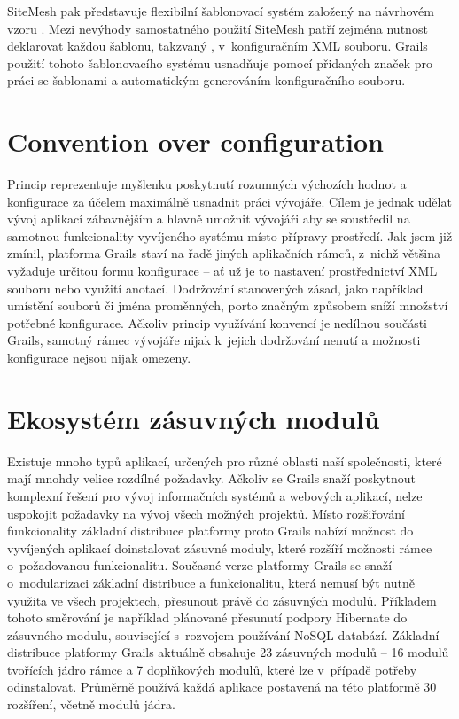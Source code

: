 \indent
SiteMesh pak představuje flexibilní šablonovací systém založený na návrhovém vzoru . Mezi nevýhody samostatného použití SiteMesh patří zejména nutnost deklarovat každou šablonu, takzvaný , v~konfiguračním XML souboru. Grails použití tohoto šablonovacího systému usnadňuje pomocí přidaných značek pro práci se šablonami a automatickým generováním konfiguračního souboru.


\section{Convention over configuration}
Princip  reprezentuje myšlenku poskytnutí rozumných výchozích hodnot a konfigurace za účelem maximálně usnadnit práci vývojáře. Cílem je jednak udělat vývoj aplikací zábavnějším a hlavně umožnit vývojáři aby se soustředil na samotnou funkcionality vyvíjeného systému místo přípravy prostředí. Jak jsem již zmínil, platforma Grails staví na řadě jiných aplikačních rámců, z~nichž většina vyžaduje určitou formu konfigurace -- ať už je to nastavení prostřednictví XML souboru nebo využití anotací. Dodržování stanovených zásad, jako například umístění souborů či jména proměnných, porto značným způsobem sníží množství potřebné konfigurace. Ačkoliv princip využívání konvencí je nedílnou součásti Grails, samotný rámec vývojáře nijak k~jejich dodržování nenutí a možnosti konfigurace nejsou nijak omezeny.

\section{Ekosystém zásuvných modulů}
Existuje mnoho typů aplikací, určených pro různé oblasti naší společnosti, které mají mnohdy velice rozdílné požadavky. Ačkoliv se Grails snaží poskytnout komplexní řešení pro vývoj informačních systémů a webových aplikací, nelze uspokojit požadavky na vývoj všech možných projektů. Místo
rozšiřování funkcionality základní distribuce platformy proto Grails nabízí možnost do vyvíjených aplikací doinstalovat zásuvné moduly, které rozšíří možnosti rámce o~požadovanou funkcionalitu. Současné verze platformy Grails se snaží o~modularizaci základní distribuce a funkcionalitu, která nemusí být nutně využita ve všech projektech, přesunout právě do zásuvných modulů. Příkladem tohoto směrování je například plánované přesunutí podpory Hibernate do zásuvného modulu, související s~rozvojem používání NoSQL databází. Základní distribuce platformy Grails aktuálně obsahuje 23 zásuvných modulů -- 16 modulů tvořících jádro rámce a 7 doplňkových modulů, které lze v~případě potřeby odinstalovat. Průměrně používá každá aplikace postavená na této platformě 30 rozšíření, včetně modulů jádra.

